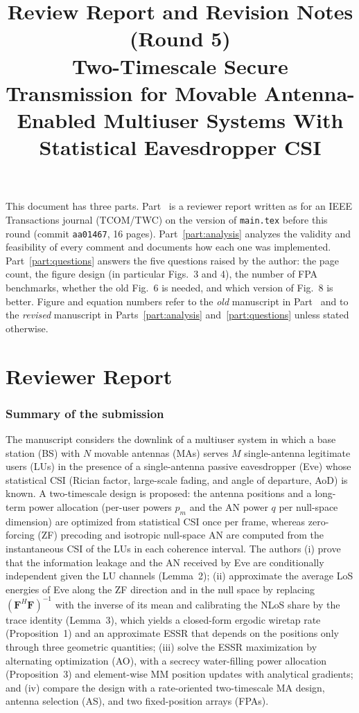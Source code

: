 \documentclass[10pt,a4paper]{article}
\title{Review Report and Revision Notes (Round 5)\\[3pt]
\large Two-Timescale Secure Transmission for Movable Antenna-Enabled Multiuser Systems With Statistical Eavesdropper CSI}
\author{}
\date{}
\newcommand{\code}[1]{\texttt{#1}}
\begin{document}
\sloppy
\maketitle

\noindent This document has three parts. Part~\ref{part:review} is a reviewer report written as for an IEEE Transactions journal (TCOM/TWC) on the version of \code{main.tex} before this round (commit \code{aa01467}, 16 pages). Part~\ref{part:analysis} analyzes the validity and feasibility of every comment and documents how each one was implemented. Part~\ref{part:questions} answers the five questions raised by the author: the page count, the figure design (in particular Figs.~3 and 4), the number of FPA benchmarks, whether the old Fig.~6 is needed, and which version of Fig.~8 is better. Figure and equation numbers refer to the \emph{old} manuscript in Part~\ref{part:review} and to the \emph{revised} manuscript in Parts~\ref{part:analysis} and~\ref{part:questions} unless stated otherwise.

\tableofcontents

\part{Reviewer Report}\label{part:review}

\section{Summary of the submission}
The manuscript considers the downlink of a multiuser system in which a base station (BS) with $N$ movable antennas (MAs) serves $M$ single-antenna legitimate users (LUs) in the presence of a single-antenna passive eavesdropper (Eve) whose statistical CSI (Rician factor, large-scale fading, and angle of departure, AoD) is known. A two-timescale design is proposed: the antenna positions and a long-term power allocation (per-user powers $p_m$ and the AN power $q$ per null-space dimension) are optimized from statistical CSI once per frame, whereas zero-forcing (ZF) precoding and isotropic null-space AN are computed from the instantaneous CSI of the LUs in each coherence interval. The authors
(i) prove that the information leakage and the AN received by Eve are conditionally independent given the LU channels (Lemma~2);
(ii) approximate the average LoS energies of Eve along the ZF direction and in the null space by replacing $(\mathbf F^H\mathbf F)^{-1}$ with the inverse of its mean and calibrating the NLoS share by the trace identity (Lemma~3), which yields a closed-form ergodic wiretap rate (Proposition~1) and an approximate ESSR that depends on the positions only through three geometric quantities;
(iii) solve the ESSR maximization by alternating optimization (AO), with a secrecy water-filling power allocation (Proposition~3) and element-wise MM position updates with analytical gradients; and
(iv) compare the design with a rate-oriented two-timescale MA design, antenna selection (AS), and two fixed-position arrays (FPAs).
\end{document}
